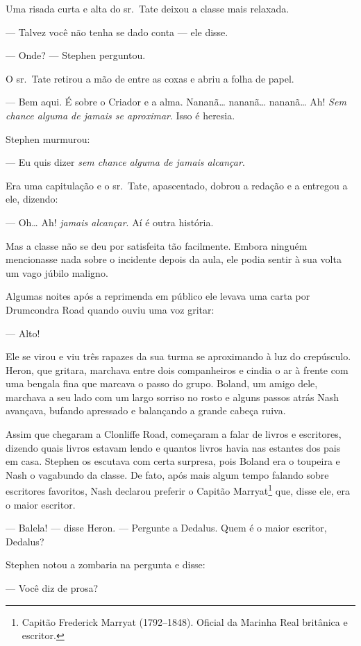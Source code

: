 Uma risada curta e alta do sr.~Tate deixou a classe mais relaxada.

 --- Talvez você não tenha se dado conta --- ele disse.

 --- Onde? --- Stephen perguntou.

O sr.~Tate retirou a mão de entre as coxas e abriu a folha de papel.

 --- Bem aqui. É sobre o Criador e a alma. Nananã\ldots{} nananã\ldots{} nananã\ldots{}
Ah! \textit{Sem chance alguma de jamais se aproximar}. Isso é heresia.

Stephen murmurou:

 --- Eu quis dizer \textit{sem chance alguma de jamais alcançar}.

Era uma capitulação e o sr.~Tate, apascentado, dobrou a redação e a
entregou a ele, dizendo:

 --- Oh\ldots{} Ah! \textit{jamais alcançar}. Aí é outra história.

Mas a classe não se deu por satisfeita tão facilmente. Embora ninguém
mencionasse nada sobre o incidente depois da aula, ele podia sentir à
sua volta um vago júbilo maligno.

Algumas noites após a reprimenda em público ele levava uma carta por
Drumcondra Road quando ouviu uma voz gritar:

 --- Alto!

Ele se virou e viu três rapazes da sua turma se aproximando à luz do
crepúsculo. Heron, que gritara, marchava entre dois companheiros e
cindia o ar à frente com uma bengala fina que marcava o passo do grupo.
Boland, um amigo dele, marchava a seu lado com um largo sorriso no
rosto e alguns passos atrás Nash avançava, bufando apressado e
balançando a grande cabeça ruiva.

Assim que chegaram a Clonliffe Road, começaram a falar de livros e
escritores, dizendo quais livros estavam lendo e quantos livros havia
nas estantes dos pais em casa. Stephen os escutava com certa surpresa,
pois Boland era o toupeira e Nash o vagabundo da classe. De fato, após
mais algum tempo falando sobre escritores favoritos, Nash
declarou preferir o Capitão Marryat\footnote{ Capitão Frederick Marryat (1792--1848). Oficial da Marinha Real britânica e escritor.} que, disse ele, era o maior
escritor.

 --- Balela! --- disse Heron. --- Pergunte a Dedalus. Quem é o maior escritor,
Dedalus?

Stephen notou a zombaria na pergunta e disse:

 --- Você diz de prosa?


